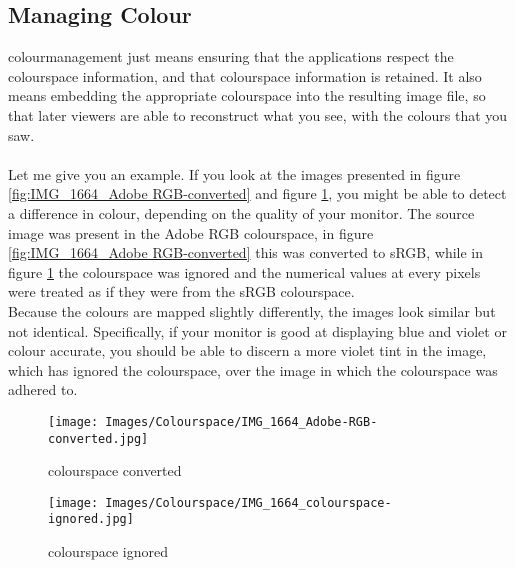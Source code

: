 \subsection{Managing Colour}

\Gls{colourmanagement} just means ensuring that the applications respect the \gls{colourspace} information, and that \gls{colourspace} information is retained. It also means embedding the appropriate \gls{colourspace} into the resulting image file, so that later viewers are able to reconstruct what you see, with the colours that you saw.
\\
\\
Let me give you an example. If you look at the images presented in figure \ref{fig:IMG_1664_Adobe RGB-converted} and figure \ref{fig:IMG_1664_colourspace ignored}, you might be able to detect a difference in colour, depending on the quality of your monitor. The source image was present in the Adobe RGB \gls{colourspace}, in figure \ref{fig:IMG_1664_Adobe RGB-converted} this was converted to sRGB, while in figure \ref{fig:IMG_1664_colourspace ignored} the \gls{colourspace} was ignored and the numerical values at every pixels were treated as if they were from the sRGB \gls{colourspace}.
\\
Because the colours are mapped slightly differently, the images look similar but not identical. Specifically, if your monitor is good at displaying blue and violet or colour accurate, you should be able to discern a more violet tint in the image, which has ignored the \gls{colourspace}, over the image in which the \gls{colourspace} was adhered to.

\begin{figure}[htb]
\begin{minipage}{.5\textwidth}
	\centering
		\texttt{[image: Images/Colourspace/IMG\_1664\_Adobe-RGB-converted.jpg]}
	\caption{colourspace converted}
	\label{fig:IMG_1664_Adobe RGB-converted}
\end{minipage}
\begin{minipage}{.5\textwidth}
	\centering
		\texttt{[image: Images/Colourspace/IMG\_1664\_colourspace-ignored.jpg]}
	\caption{colourspace ignored}
	\label{fig:IMG_1664_colourspace ignored}
	\end{minipage}
\end{figure}

